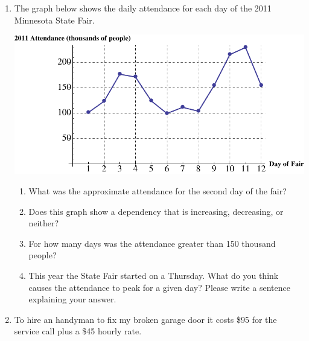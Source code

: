 \documentclass[12pt]{article}
\begin{document}
\hrulefill


\newpage
\begin{enumerate}
\item The graph below shows the daily attendance for each day of the 2011 Minnesota State Fair.

\includegraphics [width = 6in] {stateFair}

\begin{enumerate}
\item What was the approximate attendance for the second day of the fair?
\vfill
\item Does this graph show a dependency that is increasing, decreasing, or neither?
\vfill
\item For how many days was the attendance greater than 150 thousand people?
\vfill
\item This year the State Fair started on a Thursday.  What do you think causes the attendance to peak for a given day?  Please write a sentence explaining your answer.
\vfill
\end{enumerate}



\newpage
\item  To hire an handyman to fix my broken garage door it costs \$95 for the service call plus a \$45 hourly rate.


\end{enumerate}
\end{document}

